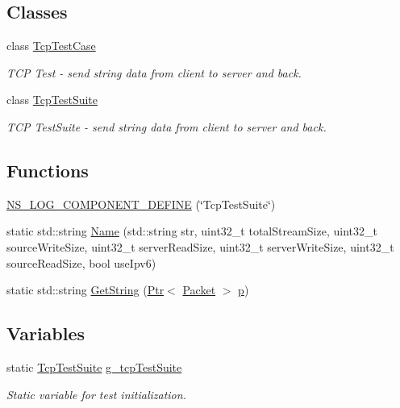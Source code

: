 \subsection*{Classes}
\begin{DoxyCompactItemize}
\item 
class \hyperlink{classTcpTestCase}{Tcp\+Test\+Case}
\begin{DoxyCompactList}\small\item\em T\+CP Test -\/ send string data from client to server and back. \end{DoxyCompactList}\item 
class \hyperlink{classTcpTestSuite}{Tcp\+Test\+Suite}
\begin{DoxyCompactList}\small\item\em T\+CP Test\+Suite -\/ send string data from client to server and back. \end{DoxyCompactList}\end{DoxyCompactItemize}
\subsection*{Functions}
\begin{DoxyCompactItemize}
\item 
\hyperlink{tcp-test_8cc_af440281485bce153cae01d88530876cd}{N\+S\+\_\+\+L\+O\+G\+\_\+\+C\+O\+M\+P\+O\+N\+E\+N\+T\+\_\+\+D\+E\+F\+I\+NE} (\char`\"{}Tcp\+Test\+Suite\char`\"{})
\item 
static std\+::string \hyperlink{tcp-test_8cc_a2f86f929dfaa0d376512285018ea86fc}{Name} (std\+::string str, uint32\+\_\+t total\+Stream\+Size, uint32\+\_\+t source\+Write\+Size, uint32\+\_\+t server\+Read\+Size, uint32\+\_\+t server\+Write\+Size, uint32\+\_\+t source\+Read\+Size, bool use\+Ipv6)
\item 
static std\+::string \hyperlink{tcp-test_8cc_ab9425fc2dc406843f955d1565b7fc804}{Get\+String} (\hyperlink{classns3_1_1Ptr}{Ptr}$<$ \hyperlink{classns3_1_1Packet}{Packet} $>$ \hyperlink{lte__link__budget__x2__handover__measures_8m_ac9de518908a968428863f829398a4e62}{p})
\end{DoxyCompactItemize}
\subsection*{Variables}
\begin{DoxyCompactItemize}
\item 
static \hyperlink{classTcpTestSuite}{Tcp\+Test\+Suite} \hyperlink{tcp-test_8cc_a1b0e0b0779ee026429208907d8b0e514}{g\+\_\+tcp\+Test\+Suite}
\begin{DoxyCompactList}\small\item\em Static variable for test initialization. \end{DoxyCompactList}\end{DoxyCompactItemize}


